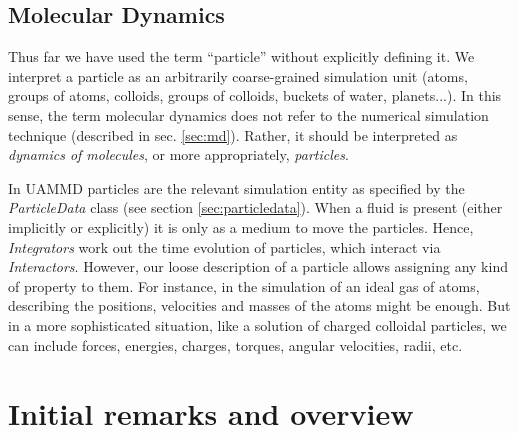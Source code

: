 \documentclass[twoside,openright,titlepage,numbers=noenddot,%
headinclude,footinclude,cleardoublepage=empty,abstract=on,
BCOR=5mm,fontsize=11pt, dvipsnames, paper=b5
]{scrreprt}
\newcommand{\uammd}{\gls{UAMMD}\xspace}
\begin{document}
\section{\uppercase{{\bfseries M}}olecular \uppercase{\textbf{D}}ynamics}\label{sec:dynmol}
Thus far we have used the term ``particle'' without explicitly defining it. We interpret a particle as an arbitrarily coarse-grained simulation unit (atoms, groups of atoms, colloids, groups of colloids, buckets of water, planets...). In this sense, the term molecular dynamics does not refer to the numerical simulation technique (described in sec. \ref{sec:md}). Rather, it should be interpreted as \emph{dynamics of molecules}, or more appropriately, \emph{particles}.

In \uammd particles are the relevant simulation entity as specified by the \emph{ParticleData} class (see section \ref{sec:particledata}). When a fluid is present (either implicitly or explicitly) it is only as a medium to move the particles. Hence, \emph{Integrators} work out the time evolution of particles, which interact via \emph{Interactors}. However, our loose description of a particle allows assigning any kind of property to them. For instance, in the simulation of an ideal gas of atoms, describing the positions, velocities and masses of the atoms might be enough. But in a more sophisticated situation, like a solution of charged colloidal particles, we can include forces, energies, charges, torques, angular velocities, radii, etc.



\chapter{Initial remarks and overview}
\end{document}
